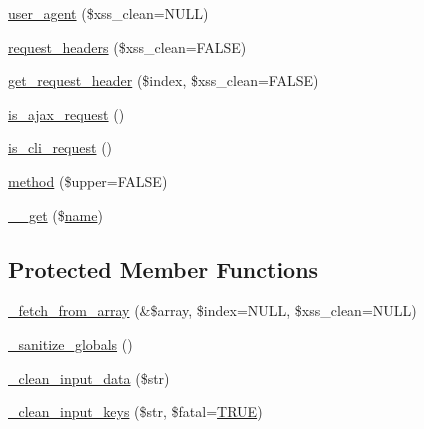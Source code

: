 \begin{DoxyCompactItemize}
\item 
\mbox{\hyperlink{class_c_i___input_a4374172b6440fd600f78ff8efc0906c9}{user\+\_\+agent}} (\$xss\+\_\+clean=N\+U\+LL)
\item 
\mbox{\hyperlink{class_c_i___input_a4bc8f8c9a9488ff359a61f1fb60e6097}{request\+\_\+headers}} (\$xss\+\_\+clean=F\+A\+L\+SE)
\item 
\mbox{\hyperlink{class_c_i___input_a099af71b54f9edbfb20576a4e8a3df41}{get\+\_\+request\+\_\+header}} (\$index, \$xss\+\_\+clean=F\+A\+L\+SE)
\item 
\mbox{\hyperlink{class_c_i___input_a4ae07120b0b2ace90eb2f7ec72b29426}{is\+\_\+ajax\+\_\+request}} ()
\item 
\mbox{\hyperlink{class_c_i___input_a70c1e8a081ef955c1a52164634d4f66e}{is\+\_\+cli\+\_\+request}} ()
\item 
\mbox{\hyperlink{class_c_i___input_aaa22626885bdf9dda2346ee6422203ef}{method}} (\$upper=F\+A\+L\+SE)
\item 
\mbox{\hyperlink{class_c_i___input_abc8e9e31bb15c8a44c3210ec551407c8}{\+\_\+\+\_\+get}} (\$\mbox{\hyperlink{waiter_2order_8php_afb270cde4944e425a37cf277116a7f43}{name}})
\end{DoxyCompactItemize}
\subsection*{Protected Member Functions}
\begin{DoxyCompactItemize}
\item 
\mbox{\hyperlink{class_c_i___input_aac46f9fee9467fac5711f236d248fbc7}{\+\_\+fetch\+\_\+from\+\_\+array}} (\&\$array, \$index=N\+U\+LL, \$xss\+\_\+clean=N\+U\+LL)
\item 
\mbox{\hyperlink{class_c_i___input_aadbb0e5cbf9b5783c872cb402ea6a2fa}{\+\_\+sanitize\+\_\+globals}} ()
\item 
\mbox{\hyperlink{class_c_i___input_a9c594152e7b189a290f6425df8712b73}{\+\_\+clean\+\_\+input\+\_\+data}} (\$str)
\item 
\mbox{\hyperlink{class_c_i___input_ac1c5fa9a21372d3dacb1fb99f9418384}{\+\_\+clean\+\_\+input\+\_\+keys}} (\$str, \$fatal=\mbox{\hyperlink{constants_8php_ae04a3efe6aa42044f803ee90c2277846}{T\+R\+UE}})
\end{DoxyCompactItemize}
